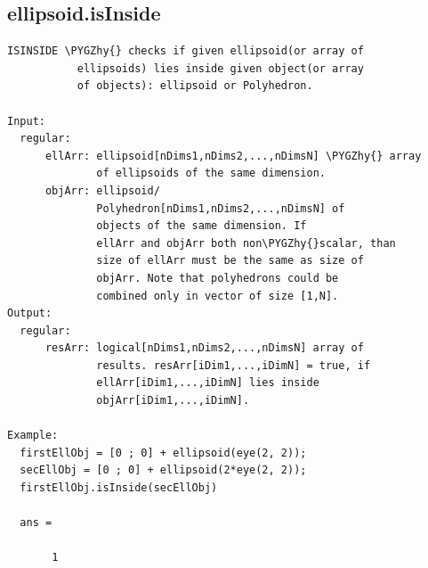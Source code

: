 \documentclass[letterpaper,10pt,english]{sphinxmanual}
\def\PYGZhy{\char`\-}
\begin{document}
\subsection{ellipsoid.isInside}
\label{chap_functions:ellipsoid-isinside}
\begin{Verbatim}[commandchars=\\\{\}]
ISINSIDE \PYGZhy{} checks if given ellipsoid(or array of
           ellipsoids) lies inside given object(or array
           of objects): ellipsoid or Polyhedron.

Input:
  regular:
      ellArr: ellipsoid[nDims1,nDims2,...,nDimsN] \PYGZhy{} array
              of ellipsoids of the same dimension.
      objArr: ellipsoid/
              Polyhedron[nDims1,nDims2,...,nDimsN] of
              objects of the same dimension. If
              ellArr and objArr both non\PYGZhy{}scalar, than
              size of ellArr must be the same as size of
              objArr. Note that polyhedrons could be
              combined only in vector of size [1,N].
Output:
  regular:
      resArr: logical[nDims1,nDims2,...,nDimsN] array of
              results. resArr[iDim1,...,iDimN] = true, if
              ellArr[iDim1,...,iDimN] lies inside
              objArr[iDim1,...,iDimN].

Example:
  firstEllObj = [0 ; 0] + ellipsoid(eye(2, 2));
  secEllObj = [0 ; 0] + ellipsoid(2*eye(2, 2));
  firstEllObj.isInside(secEllObj)

  ans =

       1
\end{Verbatim}
\end{document}
